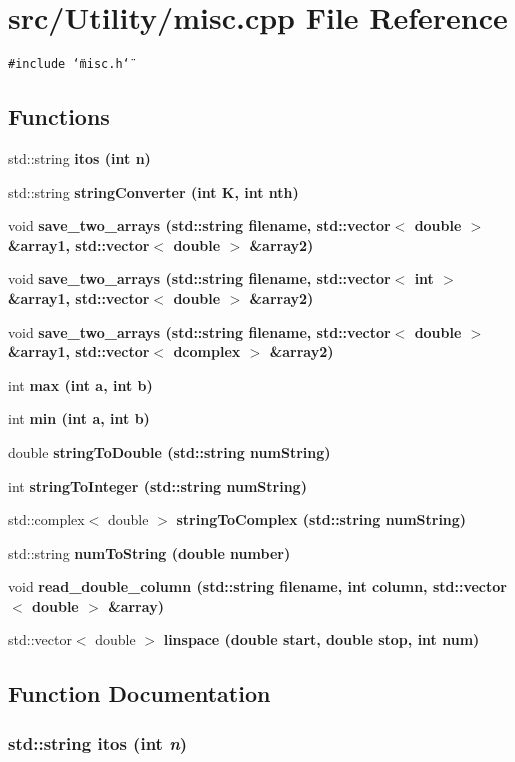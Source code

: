 \section{src/Utility/misc.cpp File Reference}
\label{misc_8cpp}
{\tt \#include \char`\"{}misc.h\char`\"{}}\par
\subsection*{Functions}
\begin{CompactItemize}
\item 
std::string \bf{itos} (int n)
\item 
std::string \bf{string\-Converter} (int K, int nth)
\item 
void \bf{save\_\-two\_\-arrays} (std::string filename, std::vector$<$ double $>$ \&array1, std::vector$<$ double $>$ \&array2)
\item 
void \bf{save\_\-two\_\-arrays} (std::string filename, std::vector$<$ int $>$ \&array1, std::vector$<$ double $>$ \&array2)
\item 
void \bf{save\_\-two\_\-arrays} (std::string filename, std::vector$<$ double $>$ \&array1, std::vector$<$ \bf{dcomplex} $>$ \&array2)
\item 
int \bf{max} (int a, int b)
\item 
int \bf{min} (int a, int b)
\item 
double \bf{string\-To\-Double} (std::string num\-String)
\item 
int \bf{string\-To\-Integer} (std::string num\-String)
\item 
std::complex$<$ double $>$ \bf{string\-To\-Complex} (std::string num\-String)
\item 
std::string \bf{num\-To\-String} (double number)
\item 
void \bf{read\_\-double\_\-column} (std::string filename, int column, std::vector$<$ double $>$ \&array)
\item 
std::vector$<$ double $>$ \bf{linspace} (double start, double stop, int num)
\end{CompactItemize}


\subsection{Function Documentation}
\subsubsection{\setlength{\rightskip}{0pt plus 5cm}std::string itos (int {\em n})}\label{misc_8cpp_5bdcfae08119c4a7fe8ad391584d4e89}


